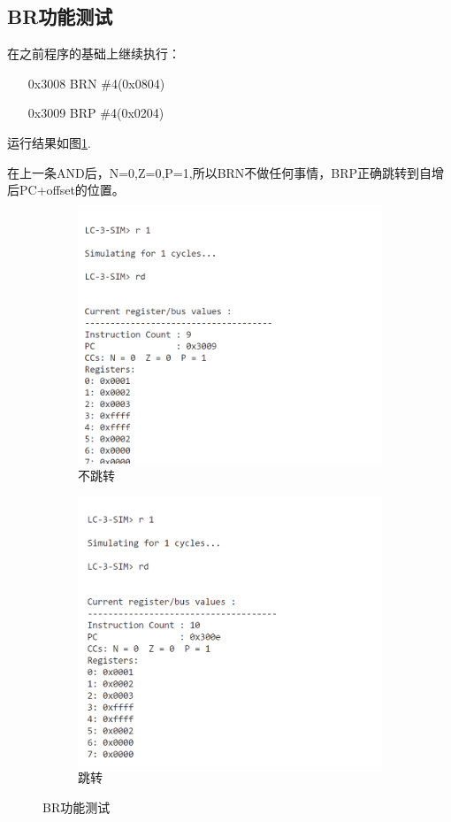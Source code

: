 \documentclass[UTF8]{ctexart}
\begin{document}
\subsection{BR功能测试}
在之前程序的基础上继续执行：
\begin{enumerate}
    \item[0x3008] BRN \#4(0x0804)
    \item[0x3009]BRP \#4(0x0204)
\end{enumerate}
运行结果如图\ref{br}.

在上一条AND后，N=0,Z=0,P=1,所以BRN不做任何事情，BRP正确跳转到自增后PC+offset的位置。
\begin{figure}[htbp]
  \centering
  \begin{subfigure}{0.48\textwidth} %
    \includegraphics[width=\linewidth]{br1.png}
    \caption{不跳转}
  \end{subfigure}
  \hfill
  \begin{subfigure}{0.48\textwidth}
    \includegraphics[width=\linewidth]{br2.png}
    \caption{跳转}
  \end{subfigure}
  \caption{BR功能测试}
  \label{br}
\end{figure}
\end{document}
